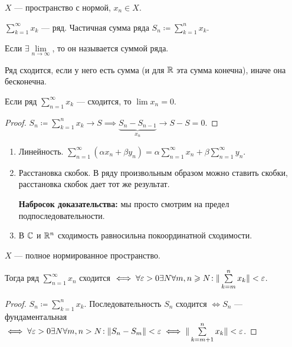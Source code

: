\begin{definition}
    $X$ --- пространство с нормой,  $x_n \in X$.

     $\sum\limits_{k=1}^\infty x_k$ --- ряд. Частичная сумма ряда  $S_n \coloneqq \sum\limits_{k=1}^n x_k$.

     Если  $\exists \lim\limits_{n \to \infty}$, то он называется суммой ряда.

     Ряд сходится, если у него есть сумма (и для $\mathbb{R}$ эта сумма конечна), иначе она бесконечна.
\end{definition}
\begin{theorem}
    Если ряд $\sum\limits_{n=1}^\infty x_k$ --- сходится, то  $\lim x_n = 0$.
\end{theorem}
\begin{proof}
    $S_n \coloneqq \sum\limits_{k=1}^n x_k \to S \implies \underbrace{S_n - S_{n-1}}_{x_n} \to S - S = 0$.
\end{proof}
\begin{properties}
    \begin{enumerate}
        \item Линейность. $\sum\limits_{n=1}^\infty (\alpha x_n + \beta y_n) = \alpha \sum\limits_{n=1}^\infty x_n + \beta \sum\limits_{n=1}^\infty y_n$.
        \item Расстановка скобок. В ряду произвольным образом можно ставить скобки, расстановка скобок дает тот же результат. 

            \textbf{Набросок доказательства:} мы просто смотрим на предел подпоследовательности.
        \item В  $\mathbb{C}$ и  $\mathbb{R}^n$ сходимость равносильна покоординатной сходимости.
    \end{enumerate}
\end{properties}
\begin{theorem}
    $X$ --- полное нормированное пространство.

    Тогда ряд  $\sum\limits_{n=1}^\infty x_n$ сходится  $\iff \forall \varepsilon > 0 \exists N \forall m,n \geqslant N\!: \| \sum\limits_{k=m}^n x_k \| < \varepsilon$.
\end{theorem}
\begin{proof}
    $S_n \coloneqq \sum\limits_{k=1}^n x_k$. Последовательность  $S_n$ сходится  $\iff S_n$ --- фундаментальная  $\iff \forall \varepsilon > 0 \exists N \forall m, n > N\!: \|S_n-S_m\| < \varepsilon \iff \| \sum\limits_{k=m+1}^n x_k \| < \varepsilon$.
\end{proof}
